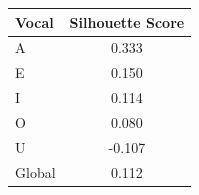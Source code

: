 \begin{tabular}{lc}
\toprule
\rowcolor{col01}
Vocal & Silhouette Score \\
\midrule
A & 0.333 \\
E & 0.150 \\
I & 0.114 \\
O & 0.080 \\
U & -0.107 \\
Global & 0.112 \\
\bottomrule
\end{tabular}
